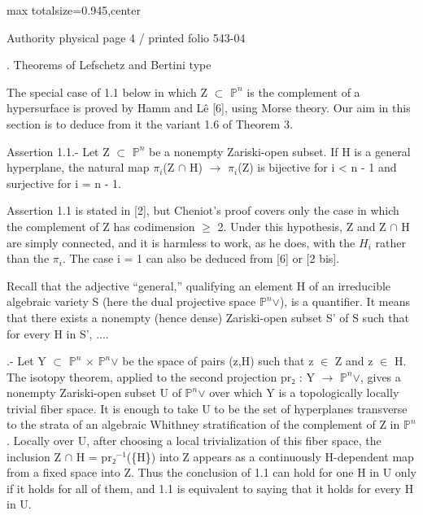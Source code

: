 \documentclass[10pt,a4paper]{article}
\begin{document}
\noindent\begin{adjustbox}{max totalsize={\textwidth}{0.945\textheight},center}
\begin{minipage}{\textwidth}
\noindent\hfill\scriptsize Authority physical page 4 / printed folio 543-04\par\normalsize
{}. Theorems of Lefschetz and Bertini type\par\smallskip
\noindent The special case of 1.1 below in which Z \ensuremath{⊂} \ensuremath{ℙ^n} is the complement of a hypersurface is proved by Hamm and Lê [6], using Morse theory. Our aim in this section is to deduce from it the variant 1.6 of Theorem 3.\par\smallskip
\noindent Assertion 1.1.- Let Z \ensuremath{⊂} \ensuremath{ℙ^n} be a nonempty Zariski-open subset. If H is a general hyperplane, the natural map \ensuremath{π_i}(Z \ensuremath{∩} H) \ensuremath{→} \ensuremath{π_i}(Z) is bijective for i < n - 1 and surjective for i = n - 1.\par\smallskip
\noindent Assertion 1.1 is stated in [2], but Cheniot's proof covers only the case in which the complement of Z has codimension \ensuremath{≥} 2. Under this hypothesis, Z and Z \ensuremath{∩} H are simply connected, and it is harmless to work, as he does, with the \ensuremath{H_i} rather than the \ensuremath{π_i}. The case i = 1 can also be deduced from [6] or [2 bis].\par\smallskip
\noindent Recall that the adjective “general,” qualifying an element H of an irreducible algebraic variety S (here the dual projective space \ensuremath{ℙ^n}\ensuremath{∨}), is a quantifier. It means that there exists a nonempty (hence dense) Zariski-open subset S' of S such that for every H in S', ....\par\smallskip
{}.- Let Y \ensuremath{⊂} \ensuremath{ℙ^n} \ensuremath{×} \ensuremath{ℙ^n}\ensuremath{∨} be the space of pairs (z,H) such that z \ensuremath{∈} Z and z \ensuremath{∈} H. The isotopy theorem, applied to the second projection pr\ensuremath{₂} : Y \ensuremath{→} \ensuremath{ℙ^n}\ensuremath{∨}, gives a nonempty Zariski-open subset U of \ensuremath{ℙ^n}\ensuremath{∨} over which Y is a topologically locally trivial fiber space. It is enough to take U to be the set of hyperplanes transverse to the strata of an algebraic Whithney stratification of the complement of Z in \ensuremath{ℙ^n}. Locally over U, after choosing a local trivialization of this fiber space, the inclusion Z \ensuremath{∩} H = pr\ensuremath{₂^{-1}}(\{H\}) into Z appears as a continuously H-dependent map from a fixed space into Z. Thus the conclusion of 1.1 can hold for one H in U only if it holds for all of them, and 1.1 is equivalent to saying that it holds for every H in U.\par\smallskip

\end{minipage}
\end{adjustbox}
\end{document}
